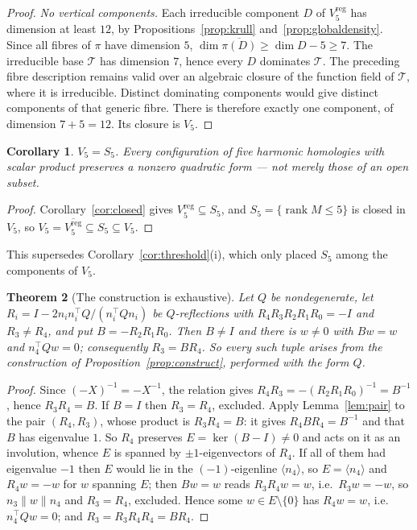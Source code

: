 \documentclass[11pt,a4paper]{article}
\theoremstyle{plain}
\newtheorem{theorem}{Theorem}[section]
\newtheorem{corollary}[theorem]{Corollary}
\theoremstyle{definition}
\theoremstyle{remark}
\newcommand{\rk}{\operatorname{rank}}
\begin{document}
\begin{proof}
\emph{No vertical components.} Each irreducible component $D$ of
$V_5^{\mathrm{reg}}$ has dimension at least $12$, by
Propositions~\ref{prop:krull} and~\ref{prop:globaldensity}. Since all fibres
of $\pi$ have dimension $5$,
$\dim\overline{\pi(D)}\ge\dim D-5\ge7$. The irreducible base
$\mathcal T$ has dimension $7$, hence every $D$ dominates $\mathcal T$.
The preceding fibre description remains valid over an algebraic closure of
the function field of $\mathcal T$, where it is irreducible. Distinct
dominating components would give distinct components of that generic fibre.
There is therefore exactly one component, of dimension $7+5=12$.
Its closure is $V_5$.
\end{proof}

\begin{corollary}\label{cor:v5s5}
$V_5=S_5$. Every configuration of five harmonic homologies with scalar product
preserves a nonzero quadratic form --- not merely those of an open subset.
\end{corollary}

\begin{proof}
Corollary~\ref{cor:closed} gives $V_5^{\mathrm{reg}}\subseteq S_5$, and
$S_5=\{\rk M\le5\}$ is closed in $V_5$, so
$V_5=\overline{V_5^{\mathrm{reg}}}\subseteq S_5\subseteq V_5$.
\end{proof}

This supersedes Corollary~\ref{cor:threshold}(i), which only placed $S_5$ among the
components of $V_5$.

\begin{theorem}[The construction is exhaustive]\label{thm:exhaustive}
Let $Q$ be nondegenerate, let $R_i=I-2n_in_i^\top Q/(n_i^\top Qn_i)$ be
$Q$-reflections with $R_4R_3R_2R_1R_0=-I$ and $R_3\neq R_4$, and put
$B=-R_2R_1R_0$. Then $B\neq I$ and there is $w\neq0$ with $Bw=w$ and
$n_4^\top Qw=0$; consequently $R_3=BR_4$. So every such tuple arises from the
construction of Proposition~\ref{prop:construct}, performed with the form $Q$.
\end{theorem}

\begin{proof}
Since $(-X)^{-1}=-X^{-1}$, the relation gives
$R_4R_3=-(R_2R_1R_0)^{-1}=B^{-1}$, hence $R_3R_4=B$. If $B=I$ then $R_3=R_4$,
excluded. Apply Lemma~\ref{lem:pair} to the pair $(R_4,R_3)$, whose product is
$R_3R_4=B$: it gives $R_4BR_4=B^{-1}$ and that $B$ has eigenvalue $1$. So $R_4$
preserves $E=\ker(B-I)\neq0$ and acts on it as an involution, whence $E$ is
spanned by $\pm1$-eigenvectors of $R_4$. If all of them had eigenvalue $-1$ then
$E$ would lie in the $(-1)$-eigenline $\langle n_4\rangle$, so $E=\langle
n_4\rangle$ and $R_4w=-w$ for $w$ spanning $E$; then $Bw=w$ reads $R_3R_4w=w$,
i.e.\ $R_3w=-w$, so $n_3\parallel w\parallel n_4$ and $R_3=R_4$, excluded. Hence
some $w\in E\setminus\{0\}$ has $R_4w=w$, i.e.\ $n_4^\top Qw=0$; and
$R_3=R_3R_4R_4=BR_4$.
\end{proof}
\end{document}
